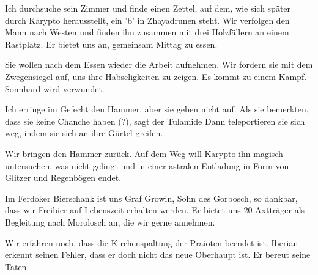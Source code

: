Ich durchsuche sein Zimmer und finde einen Zettel, auf dem, wie sich später durch Karypto herausstellt, ein 'b' in Zhayadrunen steht. Wir verfolgen den Mann nach Westen und finden ihn zusammen mit drei Holzfällern an einem Rastplatz. Er bietet uns an, gemeinsam Mittag zu essen. 

Sie wollen nach dem Essen wieder die Arbeit aufnehmen. Wir fordern sie mit dem Zwegensiegel auf, uns ihre Habseligkeiten zu zeigen. Es kommt zu einem Kampf. Sonnhard wird verwundet.

Ich erringe im Gefecht den Hammer, aber sie geben nicht auf. Als sie bemerkten, dass sie keine Chanche haben (?),  sagt der Tulamide
Dann teleportieren sie sich weg, indem sie sich an ihre Gürtel greifen. 

Wir bringen den Hammer zurück. Auf dem Weg will Karypto ihn magisch untersuchen, was nicht gelingt und in einer astralen Entladung in Form von Glitzer und Regenbögen endet. 

Im Ferdoker Bierschank ist uns Graf Growin, Sohn des Gorbosch, so dankbar, dass wir Freibier auf Lebenszeit erhalten werden. Er bietet uns 20 Axtträger als Begleitung nach Morolosch an, die wir gerne annehmen.  

Wir erfahren noch, dass die Kirchenspaltung der Praioten beendet ist. Iberian erkennt seinen Fehler, dass er doch nicht das neue Oberhaupt ist. Er bereut seine Taten. 

